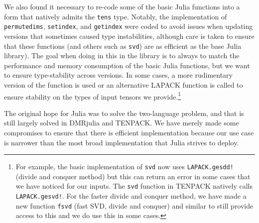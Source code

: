 \documentclass{juliacon}
\begin{document}
We also found it necessary to re-code some of the basic Julia functions into a form that natively admits the {\tt tens} type. Notably, the implementation of {\tt permutedims}, {\tt setindex}, and {\tt getindex} were coded to avoid issues when updating versions that sometimes caused type instabilities, although care is taken to ensure that these functions (and others such as {\tt svd}) are as efficient as the base Julia library). %
The goal when doing in this in the library is to always to match the performance and memory consumption of the basic Julia functions, but we want to ensure type-stability across versions. In some cases, a more rudimentary version of the function is used \cite{press1992numerical} or an alternative LAPACK function is called to ensure stability on the types of input tensors we provide.\footnote{For example, the basic implementation of {\tt svd} now uses {\tt LAPACK.gesdd!} (divide and conquer method) but this can return an error in some cases that we have noticed for our inputs. The {\tt svd} function in TENPACK natively calls {\tt LAPACK.gesvd!}. For the faster divide and conquer method, we have made a new function {\tt fsvd} (fast SVD, divide and conquer) and similar to still provide access to this and we do use this in some cases.}



The original hope for Julia was to solve the two-language problem, and that is still largely solved in DMRjulia and TENPACK. We have merely made some compromises to ensure that there is efficient implementation because our use case is narrower than the most broad implementation that Julia strives to deploy.

\end{document}
